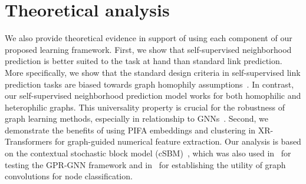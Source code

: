 \documentclass{article} \usepackage{iclr2022_conference,times}
\begin{document}
\vspace{-0.2cm}
\section{Theoretical analysis}
We also provide theoretical evidence in support of using each component of our proposed learning framework. First, we show that self-supervised neighborhood prediction is better suited to the task at hand than standard link prediction. More specifically, we show that the standard design criteria in self-supervised link prediction tasks are biased towards graph homophily assumptions~\citep{mcpherson2001birds,klicpera2018predict}. In contrast, our self-supervised neighborhood prediction model works for both homophilic and heterophilic graphs. This universality property is crucial for the robustness of graph learning methods, especially in relationship to GNNs~\citep{chien2020adaptive}. Second, we demonstrate the benefits of using PIFA embeddings and clustering in XR-Transformers for graph-guided numerical feature extraction. 
Our analysis is based on the contextual stochastic block model (cSBM)~\citep{deshpande2018contextual}, which was also used in~\cite{chien2020adaptive} for testing the GPR-GNN framework and in~\cite{baranwal2021graph} for establishing the utility of graph convolutions for node classification.
\end{document}
